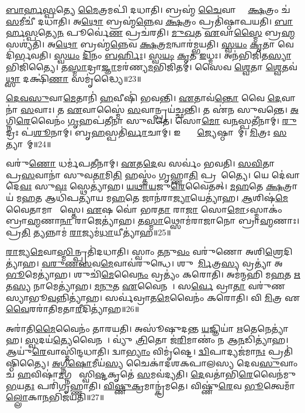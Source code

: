\ul{𑌬𑌾}\ul{𑌰𑍍}\ul{𑌹}\ul{𑌸𑍍𑌪}𑌤𑍍𑌯𑍇 \ul{𑌮𑍈}𑌤𑍍𑌰𑌮𑌪𑌿॑ 𑌦𑌧𑌾𑌤𑌿।
𑌬𑍍𑌰𑌹𑍍𑌮॑ \ul{𑌚𑍈}𑌵𑌾𑌸𑍍𑌮𑍈᳚ \ul{𑌕𑍍𑌷}𑌤𑍍𑌰𑌂 𑌚॑ \ul{𑌸}𑌮𑍀𑌚𑍀॑ 𑌦𑌧𑌾𑌤𑌿।
𑌅\ul{𑌥𑍋} 𑌬𑍍𑌰𑌹𑍍𑌮॑\ul{𑌨𑍍𑌨𑍇}𑌵 \ul{𑌕𑍍𑌷}𑌤𑍍𑌰𑌂 𑌪𑍍𑌰𑌤𑌿॑\-𑌷𑍍𑌠𑌾𑌪𑌯𑌤𑌿।
\ul{𑌬𑌾}\ul{𑌰𑍍}\ul{𑌹}\ul{𑌸𑍍𑌪}𑌤𑍍𑌯𑍇\ul{𑌨} 𑌪𑍂𑌰𑍍𑌵𑍇॑\ul{𑌣} 𑌪𑍍𑌰𑌚॑𑌰𑌤𑌿।
\ul{𑌮𑍁}\ul{𑌖}𑌤 \ul{𑌏}𑌵𑌾\ul{𑌸𑍍𑌮𑍈} 𑌬𑍍𑌰\ul{𑌹𑍍𑌮} 𑌸𑌶𑍍𑌯॑𑌤𑌿।
𑌅\ul{𑌥𑍋} 𑌬𑍍𑌰𑌹𑍍𑌮॑\ul{𑌨𑍍𑌨𑍇}𑌵 \ul{𑌕𑍍𑌷}𑌤𑍍𑌰\ul{𑌮}𑌨𑍍𑌵𑌾𑌰॑𑌮𑍍𑌭𑌯𑌤𑌿।
\ul{𑌸𑍍𑌵}\ul{𑌯𑌂} \ul{𑌕𑍃}𑌤𑌾 𑌵𑍇𑌦𑌿॑𑌰𑍍𑌭𑌵𑌤𑌿।
\ul{𑌸𑍍𑌵}\ul{𑌯𑌂} \ul{𑌦𑌿}𑌨𑌂 \ul{𑌬}\ul{𑌰𑍍}𑌹𑌿𑌃।
\ul{𑌸𑍍𑌵}\ul{𑌯𑌂} \ul{𑌕𑍃}𑌤 \ul{𑌇}𑌧𑍍𑌮𑌃।
𑌅𑌨॑𑌭𑌿𑌜𑌿𑌤\ul{𑌸𑍍𑌯𑌾}𑌭𑌿𑌜𑌿॑𑌤𑍍𑌯𑍈।
𑌤\ul{𑌸𑍍𑌮𑌾}𑌦𑍍𑌰𑌾\ul{𑌜𑍍𑌞𑌾}𑌮𑌰॑𑌣𑍍𑌯\ul{𑌮}𑌭𑌿𑌜𑌿॑𑌤𑌮𑍍।
𑌸𑍈𑌵 \ul{𑌶𑍍𑌵𑍇}𑌤𑌾 \ul{𑌶𑍍𑌵𑍇}𑌤𑌵॑\ul{𑌥𑍍𑌸𑌾} 𑌦𑌕𑍍𑌷𑌿॑\ul{𑌣𑌾} 𑌸𑌮𑍃॑𑌦𑍍𑌧𑍍𑌯𑍈॥23॥\anuvakamend[\ul{𑌰}\ul{𑌤𑍍𑌨𑌿}𑌤𑍍𑌵𑌾\ul{𑌯} 𑌸𑌮𑍃॑𑌦𑍍𑌧𑍍𑌯𑍈 𑌪\ul{𑌷𑍍𑌠𑍗}𑌹𑍀 𑌦𑌕𑍍𑌷𑌿॑\ul{𑌣𑌾} 𑌸𑌮𑍃॑𑌦𑍍𑌧𑍍𑌯𑍈 𑌗𑍍𑌰𑌾\ul{𑌮}𑌣𑍍𑌯𑍋॑ \ul{𑌗𑍃}𑌹𑍇 𑌭𑌾॑𑌗\ul{𑌦𑍁}𑌘𑌸𑍍𑌯॑ \ul{𑌗𑍃}𑌹𑍇 𑌭॑𑌵𑌤𑌿 \ul{𑌦𑍁}𑌗𑍍𑌧𑍇॑\-𑌽𑌭𑌿𑌜𑌿॑\ul{𑌤𑍍𑌯𑍈} 𑌦𑍍𑌵𑍇 𑌚॑]

\ul{𑌦𑍇}\ul{𑌵}\ul{𑌸𑍁}𑌵𑌾\ul{𑌮𑍇}𑌤𑌾𑌨𑌿॑ \ul{𑌹}𑌵𑍀𑌷𑌿॑ 𑌭𑌵𑌨𑍍𑌤𑌿।
\ul{𑌏}𑌤𑌾𑌵॑\ul{𑌨𑍍𑌤𑍋} 𑌵𑍈 \ul{𑌦𑍇}𑌵𑌾𑌨𑌾॑ \ul{𑌸}𑌵𑌾𑌃।
𑌤 \ul{𑌏}𑌵𑌾𑌸𑍍𑌮𑍈॑ \ul{𑌸}𑌵𑌾𑌨𑍍𑌪𑍍𑌰𑌯॑𑌚𑍍𑌛𑌨𑍍𑌤𑌿।
𑌤 𑌏॑𑌨 𑌸𑍁𑌵𑌨𑍍𑌤𑍇।
\ul{𑌅}𑌗𑍍𑌨𑌿\ul{𑌰𑍇}𑌵𑍈𑌨𑌂॑ \ul{𑌗𑍃}𑌹𑌪॑𑌤𑍀𑌨𑌾 𑌸𑍁𑌵𑌤𑍇।
𑌸𑍋\ul{𑌮𑍋} 𑌵\ul{𑌨}𑌸𑍍𑌪𑌤𑍀॑𑌨𑌾𑌮𑍍।
\ul{𑌰𑍁}𑌦𑍍𑌰𑌃 𑌪॑\ul{𑌶𑍂}𑌨𑌾𑌮𑍍।
𑌬𑍃\ul{𑌹}𑌸𑍍𑌪𑌤𑌿॑\ul{𑌰𑍍𑌵𑌾}𑌚𑌾𑌮𑍍।
𑌇𑌨𑍍𑌦𑍍𑌰𑍋᳚ \ul{𑌜𑍍𑌯𑍇}𑌷𑍍𑌠𑌾𑌨𑌾᳚𑌮𑍍।
\ul{𑌮𑌿}𑌤𑍍𑌰𑌃 \ul{𑌸}𑌤𑍍𑌯𑌾𑌨𑌾᳚𑌮𑍍॥24॥

𑌵𑌰𑍁॑\ul{𑌣𑍋} 𑌧𑌰𑍍𑌮॑𑌪𑌤𑍀𑌨𑌾𑌮𑍍।
\ul{𑌏}𑌤\ul{𑌦𑍇}𑌵 𑌸𑌰𑍍𑌵𑌂॑ 𑌭𑌵𑌤𑌿।
\ul{𑌸}\ul{𑌵𑌿}𑌤𑌾 𑌤𑍍𑌵𑌾᳚ 𑌪𑍍𑌰\ul{𑌸}𑌵𑌾𑌨𑌾॑ 𑌸𑍁𑌵\ul{𑌤𑌾}𑌮𑌿\ul{𑌤𑌿} 𑌹𑌸𑍍𑌤𑌂॑ 𑌗𑍃𑌹𑍍𑌣𑌾\ul{𑌤𑌿} 𑌪𑍍𑌰𑌸𑍂᳚𑌤𑍍𑌯𑍈।
𑌯𑍇 𑌦𑍇॑𑌵𑌾 𑌦𑍇\ul{𑌵𑌃} 𑌸𑍁\ul{𑌵𑌃} 𑌸𑍍𑌥𑍇𑌤𑍍𑌯𑌾॑𑌹।
\ul{𑌯}\ul{𑌥𑌾}\ul{𑌯}𑌜𑍁\ul{𑌰𑍇}𑌵𑍈𑌤𑌤𑍍।
\ul{𑌮}\ul{𑌹}𑌤𑍇 \ul{𑌕𑍍𑌷}𑌤𑍍𑌰𑌾𑌯॑ 𑌮\ul{𑌹}𑌤 𑌆𑌧𑌿॑𑌪𑌤𑍍𑌯𑌾𑌯 𑌮\ul{𑌹}𑌤𑍇 𑌜𑌾𑌨॑𑌰𑌾\ul{𑌜𑍍𑌯𑌾}𑌯𑍇𑌤𑍍𑌯𑌾॑𑌹।
\ul{𑌆}𑌶𑌿𑌷॑\ul{𑌮𑍇}𑌵𑍈𑌤𑌾𑌮𑌾 𑌶𑌾᳚𑌸𑍍𑌤𑍇।
\ul{𑌏}𑌷 𑌵𑍋॑ 𑌭𑌰\ul{𑌤𑌾} 𑌰𑌾\ul{𑌜𑌾} 𑌸𑍋\ul{𑌮𑍋}\-𑌽𑌸𑍍𑌮𑌾𑌕𑌂॑ 𑌬𑍍𑌰𑌾\ul{𑌹𑍍𑌮}𑌣𑌾\ul{𑌨𑌾}\ul{} 𑌰𑌾𑌜𑍇𑌤𑍍𑌯𑌾॑𑌹।
𑌤\ul{𑌸𑍍𑌮𑌾}𑌥𑍍𑌸𑍋𑌮॑𑌰𑌾𑌜𑌾𑌨𑍋 𑌬𑍍𑌰𑌾\ul{𑌹𑍍𑌮}𑌣𑌾𑌃।
𑌪𑍍𑌰\ul{𑌤𑌿} 𑌤𑍍𑌯𑌨𑍍𑌨𑌾𑌮॑ \ul{𑌰𑌾}𑌜𑍍𑌯𑌮॑\ul{𑌧𑌾}𑌯𑍀𑌤𑍍𑌯𑌾॑𑌹॥25॥

\ul{𑌰𑌾}𑌜𑍍𑌯\ul{𑌮𑍇}𑌵𑌾\ul{𑌸𑍍𑌮𑌿}𑌨𑍍𑌪𑍍𑌰𑌤𑌿॑\-𑌦𑌧𑌾𑌤𑌿।
𑌸𑍍𑌵𑌾𑌂 \ul{𑌤}𑌨𑍁\ul{𑌵𑌂} 𑌵𑌰𑍁॑𑌣𑍋 𑌅𑌶𑌿\ul{𑌶𑍍𑌰𑍇}𑌦𑌿\-𑌤𑍍𑌯𑌾॑𑌹।
\ul{𑌵}\ul{𑌰𑍁}\ul{𑌣}\ul{𑌸}𑌵\ul{𑌮𑍇}𑌵𑌾𑌵॑𑌰𑍁𑌨𑍍𑌧𑍇।
𑌶𑍁𑌚𑍇᳚\ul{𑌰𑍍𑌮𑌿}𑌤𑍍𑌰\ul{𑌸𑍍𑌯} 𑌵𑍍𑌰𑌤𑍍𑌯𑌾॑ 𑌅\ul{𑌭𑍂}𑌮𑍇𑌤𑍍𑌯𑌾॑𑌹।
𑌶𑍁𑌚𑌿॑\ul{𑌮𑍇}𑌵𑍈\ul{𑌨𑌂} 𑌵𑍍𑌰𑌤𑍍𑌯𑌂॑ 𑌕𑌰𑍋𑌤𑌿।
𑌅𑌮॑𑌨𑍍𑌮𑌹𑌿 𑌮\ul{𑌹}𑌤 \ul{𑌋}𑌤\ul{𑌸𑍍𑌯} 𑌨𑌾𑌮𑍇𑌤𑍍𑌯𑌾॑𑌹।
\ul{𑌮}\ul{𑌨𑍁}𑌤 \ul{𑌏}𑌵𑍈𑌨𑌮𑍍᳚।
𑌸\ul{𑌰𑍍𑌵𑍇} 𑌵𑍍𑌰𑌾\ul{𑌤𑌾} 𑌵𑌰𑍁॑𑌣𑌸𑍍𑌯𑌾𑌭𑍂\ul{𑌵}𑌨𑍍𑌨𑌿𑌤𑍍𑌯𑌾॑𑌹।
𑌸𑌰𑍍𑌵॑𑌵𑍍𑌰𑌾𑌤\ul{𑌮𑍇}𑌵𑍈𑌨𑌂॑ 𑌕𑌰𑍋𑌤𑌿।
𑌵𑌿 \ul{𑌮𑌿}𑌤𑍍𑌰 𑌏\ul{𑌵𑍈}𑌰𑌰𑌾॑𑌤𑌿𑌮𑌤𑌾\ul{𑌰𑍀}𑌦𑌿𑌤𑍍𑌯𑌾॑𑌹॥26॥

𑌅𑌰𑌾॑𑌤𑌿\ul{𑌮𑍈}𑌵𑍈𑌨𑌂॑ 𑌤𑌾𑌰𑌯𑌤𑌿।
𑌅𑌸𑍂॑𑌷𑍁𑌦𑌨𑍍𑌤 \ul{𑌯}𑌜𑍍𑌞𑌿𑌯𑌾॑ \ul{𑌋}𑌤𑍇𑌨𑍇𑌤𑍍𑌯𑌾॑𑌹।
\ul{𑌸𑍍𑌵}𑌦𑌯॑\ul{𑌤𑍍𑌯𑍇}𑌵𑍈𑌨𑌮𑍍᳚।
𑌵𑍍𑌯𑍁॑ \ul{𑌤𑍍𑌰𑌿}𑌤𑍋 𑌜॑\ul{𑌰𑌿}𑌮𑌾𑌣𑌂॑ 𑌨 𑌆\ul{𑌨}𑌡𑌿𑌤𑍍𑌯𑌾॑𑌹।
𑌆𑌯𑍁॑\ul{𑌰𑍇}𑌵𑌾𑌸𑍍𑌮𑌿॑𑌨𑍍𑌦𑌧𑌾𑌤𑌿।
𑌦𑍍𑌵𑌾\ul{𑌭𑍍𑌯𑌾𑌂} 𑌵𑌿𑌮𑍃॑𑌷𑍍𑌟𑍇।
\ul{𑌦𑍍𑌵𑌿}𑌪𑌾𑌦𑍍𑌯𑌜॑𑌮𑌾\ul{𑌨𑌃} 𑌪𑍍𑌰𑌤𑌿॑\-𑌷𑍍𑌠𑌿𑌤𑍍𑌯𑍈।
\ul{𑌅}\ul{𑌗𑍍𑌨𑍀}\ul{𑌷𑍋}𑌮𑍀𑌯॑\ul{𑌸𑍍𑌯} 𑌚𑍈𑌕𑌾॑𑌦𑌶𑌕𑌪𑌾𑌲𑌸𑍍𑌯 𑌦𑍇𑌵\ul{𑌸𑍁}𑌵𑌾𑌂 𑌚॑ \ul{𑌹}𑌵𑌿𑌷𑌾॑\ul{𑌮}𑌗𑍍𑌨𑌯𑍇᳚ 𑌸𑍍𑌵𑌿\ul{𑌷𑍍𑌟}𑌕𑍃𑌤𑍇॑ \ul{𑌸}𑌮𑌵॑𑌦𑍍𑌯𑌤𑌿।
\ul{𑌦𑍇}𑌵𑌤𑌾॑𑌭𑌿\ul{𑌰𑍇}𑌵𑍈𑌨॑𑌮𑍁\ul{𑌭}𑌯\ul{𑌤𑌃} 𑌪𑌰𑌿॑𑌗𑍃𑌹𑍍𑌣𑌾𑌤𑌿।
\ul{𑌵𑌿}\ul{𑌷𑍍𑌣𑍁}\ul{𑌕𑍍𑌰}𑌮𑌾𑌨𑍍𑌕𑍍𑌰॑𑌮𑌤𑍇।
𑌵𑌿𑌷𑍍𑌣𑍁॑\ul{𑌰𑍇}𑌵 \ul{𑌭𑍂}𑌤𑍍𑌵𑍇𑌮𑌾𑌁\ul{𑌲𑍍𑌲𑍋}𑌕𑌾\ul{𑌨}𑌭𑌿\-𑌜॑𑌯𑌤𑌿॥27॥\anuvakamend[\ul{𑌸}𑌤𑍍𑌯𑌾𑌨𑌾॑𑌮\ul{𑌧𑌾}𑌯𑍀𑌤𑍍𑌯𑌾॑𑌹𑌾𑌤𑌾\ul{𑌰𑍀}𑌦𑌿𑌤𑍍𑌯𑌾॑𑌹 𑌕𑍍𑌰𑌮\ul{𑌤} 𑌏𑌕𑌂॑ 𑌚]

